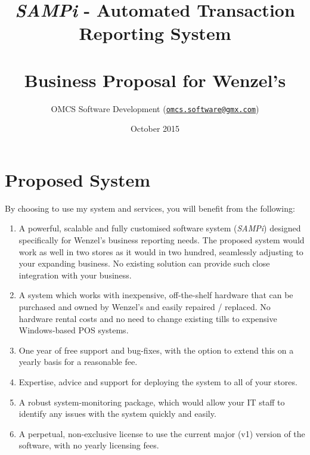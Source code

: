 \documentclass[a4paper,12pt]{article}
\title{\textit{SAMPi} - Automated Transaction Reporting System\\~\\Business Proposal for Wenzel's}
\author{OMCS Software Development (\href{mailto:omcs.software@gmx.com}{\nolinkurl{omcs.software@gmx.com}})}
\date{October 2015}
\begin{document}
\null  %
\pagestyle{empty}
\nointerlineskip  %
\vfill
\let\snewpage \newpage
\let\newpage \relax
\maketitle
\let \newpage \snewpage
\vfill 
\break %
\thispagestyle{empty}
\maketitle
\thispagestyle{empty}
\newpage
\pagestyle{fancy}
\thispagestyle{fancy}
\section*{Proposed System}
By choosing to use my system and services, you will benefit from the following:
\begin{enumerate}
    \item {A powerful, scalable and fully customised software system (\textit{SAMPi}) designed specifically for Wenzel's business reporting needs. The proposed system would work as well in two stores as it would in two hundred, seamlessly adjusting to your expanding business. No existing solution can provide such close integration with your business.}
    \item {A system which works with inexpensive, off-the-shelf hardware that can be purchased and owned by Wenzel's and easily repaired / replaced. No hardware rental costs and no need to change existing tills to expensive Windows-based POS systems.}
    \item {One year of free support and bug-fixes, with the option to extend this on a yearly basis for a reasonable fee.}
    \item {Expertise, advice and support for deploying the system to all of your stores.}
    \item {A robust system-monitoring package, which would allow your IT staff to identify any issues with the system quickly and easily.}
    \item {A perpetual, non-exclusive license to use the current major (v1) version of the software, with no yearly licensing fees.}
\end{enumerate}
\end{document}
